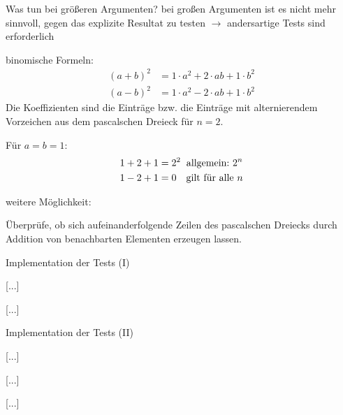 \documentclass[t, utf8x, 10pt]{beamer}
\begin{document}
\begin{frame}{Was tun bei größeren Argumenten?}
bei großen Argumenten ist es nicht mehr sinnvoll, gegen das explizite Resultat
zu testen $\rightarrow$ andersartige Tests sind erforderlich

\vspace{\baselineskip}
binomische Formeln:
\begin{displaymath}
 \begin{aligned}
  (a+b)^2 &= 1\cdot a^2+2\cdot ab+1\cdot b^2\\
  (a-b)^2 &= 1\cdot a^2-2\cdot ab+1\cdot b^2
 \end{aligned}
\end{displaymath}
Die Koeffizienten sind die Einträge bzw. die Einträge mit alternierendem Vorzeichen
aus dem pascalschen Dreieck für $n=2$.

\vspace{\baselineskip}
Für $a=b=1$:
\begin{displaymath}
 \begin{aligned}
  1+2+1 &= 2^2\hspace{0.2truecm} \text{allgemein:}\ 2^n \\
  1-2+1 &= 0\hspace{0.35truecm}    \text{gilt für alle $n$} \\
 \end{aligned}
\end{displaymath}

\vspace{1\baselineskip}
weitere Möglichkeit:

Überprüfe, ob sich aufeinanderfolgende Zeilen des pascalschen Dreiecks durch
Addition von benachbarten Elementen erzeugen lassen.
\end{frame}


\begin{frame}{Implementation der Tests (I)}
 \begin{small}
  [...]
  
  [...]
  
  [...]
 \end{small}
\end{frame}


\begin{frame}{Implementation der Tests (II)}
 \begin{small}
  
  [...]
  
  [...]
  
  [...]
 \end{small}
\end{frame}
\end{document}
